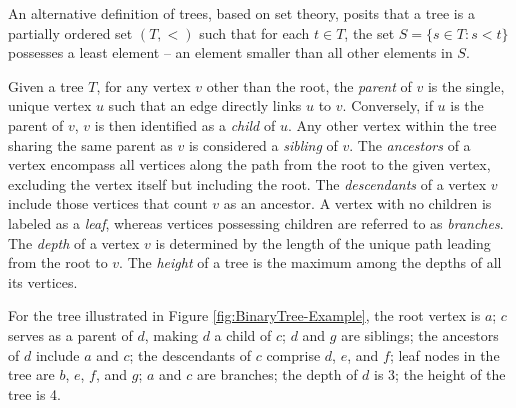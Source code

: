 \begin{example}
An alternative definition of trees, based on set theory, posits that a tree is a partially ordered set $(T, <)$ such that for each $t \in T$, the set $S = \{ s \in T : s < t \}$ possesses a least element – an element smaller than all other elements in $S$.
\end{example}

Given a tree $T$, for any vertex $v$ other than the root, the \emph{parent} of $v$ is the single, unique vertex $u$ such that an edge directly links $u$ to $v$. Conversely, if $u$ is the parent of $v$, $v$ is then identified as a \emph{child} of $u$. Any other vertex within the tree sharing the same parent as $v$ is considered a \emph{sibling} of $v$. The \emph{ancestors} of a vertex encompass all vertices along the path from the root to the given vertex, excluding the vertex itself but including the root. The \emph{descendants} of a vertex $v$ include those vertices that count $v$ as an ancestor. A vertex with no children is labeled as a \emph{leaf}, whereas vertices possessing children are referred to as \emph{branches}. The \emph{depth} of a vertex $v$ is determined by the length of the unique path leading from the root to $v$. The \emph{height} of a tree is the maximum among the depths of all its vertices.

\begin{example}
For the tree illustrated in Figure \ref{fig:BinaryTree-Example}, the root vertex is $a$; $c$ serves as a parent of $d$, making $d$ a child of $c$; $d$ and $g$ are siblings; the ancestors of $d$ include $a$ and $c$; the descendants of $c$ comprise $d$, $e$, and $f$; leaf nodes in the tree are $b$, $e$, $f$, and $g$; $a$ and $c$ are branches; the depth of $d$ is 3; the height of the tree is 4.
\end{example}

